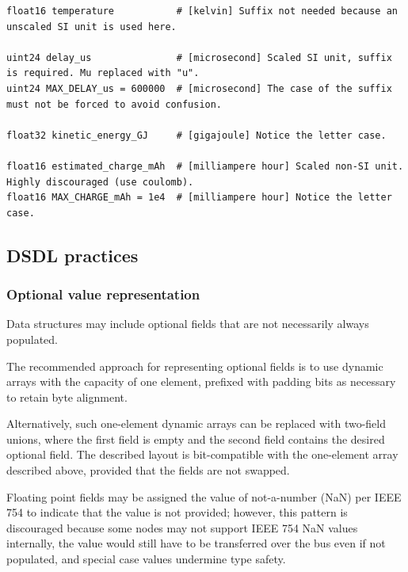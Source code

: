 \begin{remark}
\begin{verbatim}
float16 temperature           # [kelvin] Suffix not needed because an unscaled SI unit is used here.

uint24 delay_us               # [microsecond] Scaled SI unit, suffix is required. Mu replaced with "u".
uint24 MAX_DELAY_us = 600000  # [microsecond] The case of the suffix must not be forced to avoid confusion.

float32 kinetic_energy_GJ     # [gigajoule] Notice the letter case.

float16 estimated_charge_mAh  # [milliampere hour] Scaled non-SI unit. Highly discouraged (use coulomb).
float16 MAX_CHARGE_mAh = 1e4  # [milliampere hour] Notice the letter case.
\end{verbatim}
\end{remark}

\subsection{DSDL practices}

\subsubsection{Optional value representation}

Data structures may include optional fields that are not necessarily always populated.

The recommended approach for representing optional fields
is to use dynamic arrays with the capacity of one element,
prefixed with padding bits as necessary to retain byte alignment.

Alternatively, such one-element dynamic arrays can be replaced with two-field unions,
where the first field is empty and the second field contains the desired optional field.
The described layout is bit-compatible with the one-element array described above,
provided that the fields are not swapped.

Floating point fields may be assigned the value of not-a-number (NaN) per IEEE 754
to indicate that the value is not provided;
however, this pattern is discouraged because some nodes may not support IEEE 754 NaN values internally,
the value would still have to be transferred over the bus even if not populated,
and special case values undermine type safety.

